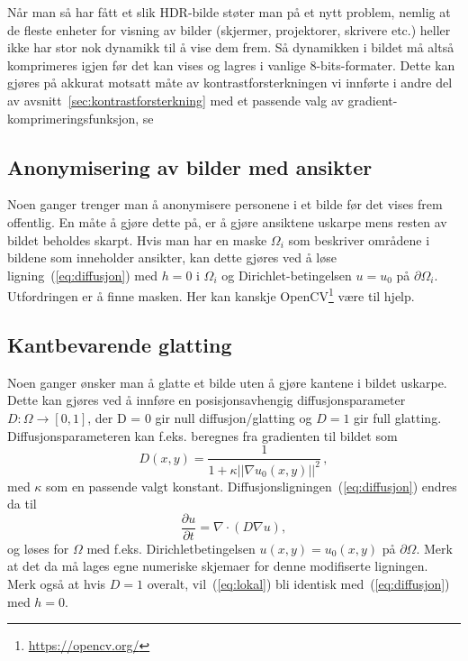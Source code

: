 \documentclass[11pt,a4paper]{article}
\begin{document}
Når man så har fått et slik HDR-bilde støter man på et nytt problem, nemlig at de fleste enheter for visning av bilder (skjermer, projektorer, skrivere etc.) heller ikke har stor nok dynamikk til å vise dem frem. Så dynamikken i bildet må altså komprimeres igjen før det kan vises og lagres i vanlige 8-bits-formater. Dette kan gjøres på akkurat motsatt måte av kontrastforsterkningen vi innførte i andre del av avsnitt~\ref{sec:kontrastforsterkning} med et passende valg av gradient-komprimeringsfunksjon, se~\cite{Fattal:02}

\subsection{Anonymisering av bilder med ansikter}

Noen ganger trenger man å anonymisere personene i et bilde før det vises frem offentlig. En måte å gjøre dette på, er å gjøre ansiktene uskarpe mens resten av bildet beholdes skarpt. Hvis man har en maske $\Omega_i$ som beskriver områdene i bildene som inneholder ansikter, kan dette gjøres ved å løse ligning~(\ref{eq:diffusjon}) med $h=0$ i $\Omega_i$ og Dirichlet-betingelsen $u = u_0$ på $\partial\Omega_i$. Utfordringen er å finne masken. Her kan kanskje OpenCV\footnote{\url{https://opencv.org/}} være til hjelp.

\subsection{Kantbevarende glatting}
\label{sec:utvidelse_end}

Noen ganger ønsker man å glatte et bilde uten å gjøre kantene i bildet uskarpe. Dette kan gjøres ved å innføre en posisjonsavhengig diffusjonsparameter $D : \Omega \to [0, 1]$, der D = 0 gir null diffusjon/glatting og $D = 1$ gir full glatting. Diffusjonsparameteren kan f.eks. beregnes fra gradienten til bildet som
\begin{equation}
  D(x, y) = \frac{1}{1 + \kappa ||\nabla u_0(x, y)||^2}\,,
\end{equation}
med $\kappa$ som en passende valgt konstant.
Diffusjonsligningen~(\ref{eq:diffusjon}) endres da til
\begin{equation}
  \label{eq:lokal}
  \frac{\partial u}{\partial t} = \nabla\cdot(D\nabla u),
\end{equation}
og løses for $\Omega$ med f.eks. Dirichletbetingelsen $u(x, y) = u_0(x, y)$ på $\partial\Omega$. Merk at det da må lages egne numeriske skjemaer for denne modifiserte ligningen. Merk også at hvis $D=1$ overalt, vil~(\ref{eq:lokal}) bli identisk med~(\ref{eq:diffusjon}) med $h=0$.
\end{document}
